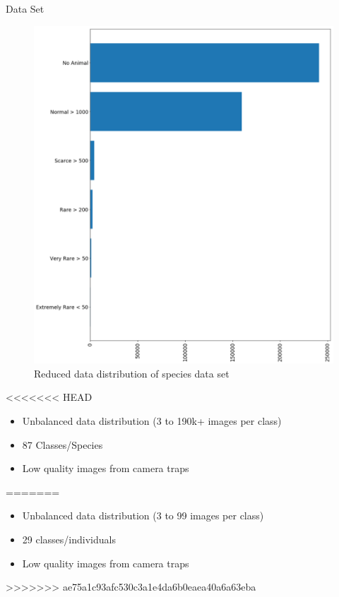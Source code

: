 \documentclass[10pt]{beamer}
\begin{document}
\begin{frame}{Data Set}
	\begin{minipage}[c]{0.48\linewidth}
		\centering
		\begin{figure}
			\includegraphics[width=\linewidth,height=.8\textheight,keepaspectratio]{images/Data_dist_sorted_reduced_v2.png}
			\caption{Reduced data distribution of species data set}
		\end{figure}
	\end{minipage}
	\hfill
	\begin{minipage}[c]{0.48\linewidth}
<<<<<<< HEAD
	\begin{itemize}
		\item Unbalanced data distribution (3 to 190k+ images per class)
		\item 87 Classes/Species
		\item Low quality images from camera traps
	\end{itemize}

=======
		\begin{itemize}
			\item Unbalanced data distribution (3 to 99 images per class)
			\item 29 classes/individuals
			\item Low quality images from camera traps
		\end{itemize}
>>>>>>> ae75a1c93afc530c3a1e4da6b0eaea40a6a63eba
	\end{minipage}
\end{frame}
\end{document}
